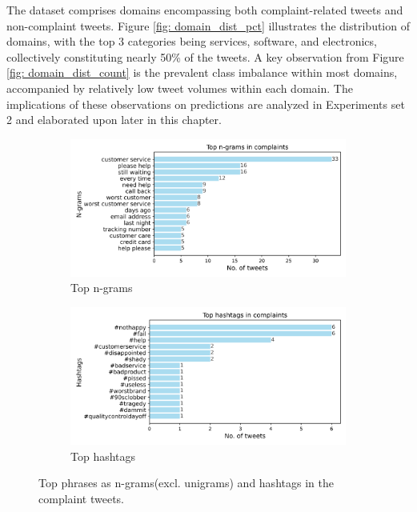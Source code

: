 The dataset comprises domains encompassing both complaint-related tweets and non-complaint tweets. Figure \ref{fig: domain_dist_pct} illustrates the distribution of domains, with the top 3 categories being services, software, and electronics, collectively constituting nearly 50\% of the tweets. A key observation from Figure \ref{fig: domain_dist_count} is the prevalent class imbalance within most domains, accompanied by relatively low tweet volumes within each domain. The implications of these observations on predictions are analyzed in Experiments set 2 and elaborated upon later in this chapter.

\begin{figure}[htbp]
    \centering
    \captionsetup{font=small}
    \begin{subfigure}{0.49\textwidth}
        \centering
        \includegraphics[width=\linewidth]{figures/top_ngram_horiz_bar.png}
        \caption{Top n-grams}
        \label{fig: top_ngrams}
    \end{subfigure}
    \hfill
    \begin{subfigure}{0.49\textwidth}
        \centering
        \includegraphics[width=\linewidth]{figures/top_hash_horiz_bar.png}
        \caption{Top hashtags}
        \label{fig: top_hashtags}
    \end{subfigure}
    \caption{Top phrases as n-grams(excl. unigrams) and hashtags in the complaint tweets.}
    \label{fig: top_ngrams_hashtags}
\end{figure}


